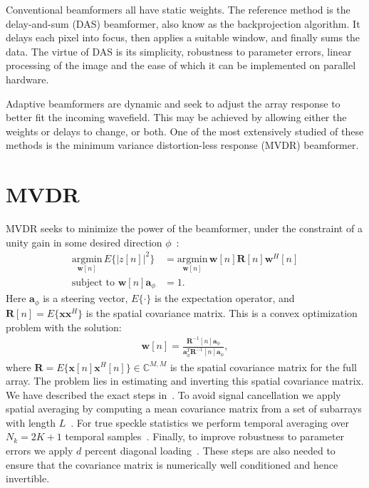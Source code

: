 \documentclass[10pt,journal,draftclsnofoot,onecolumn]{IEEEtran}
\newcommand\nn{\nonumber\\}
\newcommand\argmin[1]{\text{arg}\;\underset{#1}{\text{min}}}
\newcommand\T{^{\scriptscriptstyle T}}
\renewcommand\H{^{\scriptscriptstyle H}}
\renewcommand\vec[1]{\boldsymbol{#1}}
\newcommand\mat[1]{\boldsymbol{#1}}
\newcommand\1{\vec 1}
\renewcommand*\a{\vec a}
\newcommand*\w{\vec w}
\newcommand*\x{\vec x}
\newcommand*\R{\mat R}
\newcommand*\Ri{\R^{-1}}
\renewcommand\argmin{\text{argmin}}
\begin{document}
Conventional beamformers all have static weights. The reference method is the delay-and-sum (DAS) beamformer, also know as the backprojection algorithm. It delays each pixel into focus, then applies a suitable window, and finally sums the data. The virtue of DAS is its simplicity, robustness to parameter errors, linear processing of the image and the ease of which it can be implemented on parallel hardware.

Adaptive beamformers are dynamic and seek to adjust the array response to better fit the incoming wavefield. This may be achieved by allowing either the weights or delays to change, or both. One of the most extensively studied of these methods is the minimum variance distortion-less response (MVDR) beamformer.

\section{MVDR}\label{sec:mvdr}

MVDR seeks to minimize the power of the beamformer, under the constraint of a unity gain in some desired direction $\phi$~\cite{Capon1969}:
%
\begin{align}
\underset{\w[n]}{\argmin}\, E\{\big|z[n]\big|^2\} &= \underset{\w[n]}{\argmin}\, \w[n]\R[n]\w\H[n]\nn
\text{subject to } \w[n]\a_\phi &= 1.\label{eq:mvdr_definition}
\end{align}
%
Here $\a_\phi$ is a steering vector, $E\{\cdot\}$ is the expectation operator, and $\R[n] = E\{\x\x\H\}$ is the spatial covariance matrix. This is a convex optimization problem with the solution:
%
\begin{gather}
\vec w[n] = \frac{\Ri[n]\a_\phi}{\a_\phi\T\Ri[n]\a_\phi},\label{eq:mvdr_weights}
\end{gather}
where $\R=E\{\x[n]\x\H[n]\}\in\mathbb{C}^{M,M}$ is the spatial covariance matrix for the full array. The problem lies in estimating and inverting this spatial covariance matrix. We have described the exact steps in~\cite{Buskenes2014}. To avoid signal cancellation we apply spatial averaging by computing a mean covariance matrix from a set of subarrays with length $L$~\cite{Kailath1985}. For true speckle statistics we perform temporal averaging over $N_k = 2K+1$ temporal samples~\cite{Synnevag2009a}. Finally, to improve robustness to parameter errors we apply $d$ percent diagonal loading~\cite{Cox1987,Maksym1979}. These steps are also needed to ensure that the covariance matrix is numerically well conditioned and hence invertible.
\end{document}
